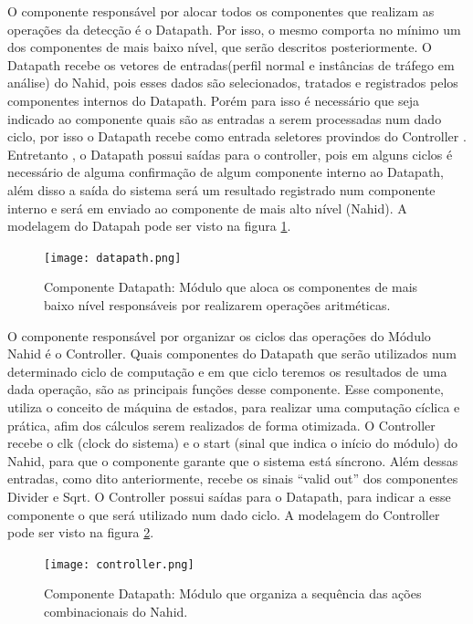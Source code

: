 \documentclass[conference]{IEEEtran}
\begin{document}
O componente responsável por alocar todos os componentes que realizam as
operações da detecção é o Datapath. Por isso, o mesmo comporta no mínimo um dos
componentes de mais baixo nível, que serão descritos posteriormente. O Datapath recebe
os vetores de entradas(perfil normal e instâncias de tráfego em análise) do Nahid, pois esses
dados são selecionados, tratados e registrados pelos componentes internos do Datapath.
Porém para isso é necessário que seja indicado ao componente quais são as entradas a
serem processadas num dado ciclo, por isso o Datapath recebe como entrada seletores
provindos do Controller . Entretanto , o Datapath possui saídas para o controller, pois
em alguns ciclos é necessário de alguma confirmação de algum componente interno ao
Datapath, além disso a saída do sistema será um resultado registrado num componente
interno e será em enviado ao componente de mais alto nível (Nahid). A modelagem do Datapah pode ser visto na figura \ref{datapath}.

\begin{figure}[htbp]
	\centerline{\texttt{[image: datapath.png]}}
	\caption{Componente Datapath: Módulo que aloca os componentes de mais baixo nível responsáveis por realizarem operações aritméticas.}
	\label{datapath}
\end{figure}
O componente responsável por organizar os ciclos das operações do Módulo Nahid
é o Controller. Quais componentes do Datapath que serão utilizados num determinado
ciclo de computação e em que ciclo teremos os resultados de uma dada operação, são as
principais funções desse componente. Esse componente, utiliza o conceito de máquina de
estados, para realizar uma computação cíclica e prática, afim dos cálculos serem realizados de forma otimizada. O Controller recebe o clk (clock do sistema) e o start (sinal que indica o início do módulo) do Nahid, para que o componente garante que o sistema está síncrono. Além dessas entradas, como dito anteriormente, recebe os sinais “valid out” dos componentes Divider e Sqrt. O Controller possui saídas para o Datapath, para indicar a esse componente o que será utilizado num dado ciclo.  A modelagem do Controller pode ser visto na figura \ref{controller}.
\begin{figure}[htbp]
	\centerline{\texttt{[image: controller.png]}}
	\caption{Componente Datapath: Módulo que organiza a sequência das ações combinacionais do Nahid.}
	\label{controller}
\end{figure}
\end{document}
